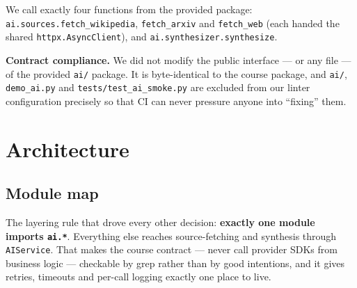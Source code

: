 \documentclass[11pt,a4paper]{article}
\begin{document}
We call exactly four functions from the provided package: \texttt{ai.sources.fetch\_wikipedia},
\texttt{fetch\_arxiv} and \texttt{fetch\_web} (each handed the shared \texttt{httpx.AsyncClient}),
and \texttt{ai.synthesizer.synthesize}.

\begin{deliverbox}
\textbf{Contract compliance.} We did not modify the public interface --- or any file --- of the
provided \texttt{ai/} package. It is byte-identical to the course package, and \texttt{ai/},
\texttt{demo\_ai.py} and \texttt{tests/test\_ai\_smoke.py} are excluded from our linter
configuration precisely so that CI can never pressure anyone into ``fixing'' them.
\end{deliverbox}

\section{Architecture}\label{sec:arch}

\subsection{Module map}

The layering rule that drove every other decision: \textbf{exactly one module imports
\texttt{ai.*}}. Everything else reaches source-fetching and synthesis through \texttt{AIService}.
That makes the course contract --- never call provider SDKs from business logic --- checkable by
grep rather than by good intentions, and it gives retries, timeouts and per-call logging exactly
one place to live.
\end{document}

